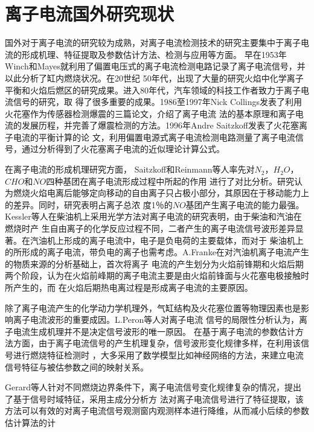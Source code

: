 \section{离子电流国外研究现状}
国外对于离子电流的研究较为成熟，对离子电流检测技术的研究主要集中于离子电流的形成机理、特征提取及参数估计方法、检测与应用等方面。
早在1953年Winch和Mayes\cite{winch1953method}就利用了偏置电压式的离子电流检测电路记录了离子电流信号，并以此分析了缸内燃烧状况。在20世纪
50年代，出现了大量的研究火焰中化学离子平衡和火焰后燃区的研究成果。进入80年代，汽车领域的科技工作者致力于离子电流信号的研究，取
得了很多重要的成果。1986至1997年Nick Collings\cite{collings1986knock,collings1991plug,collings1985knock}发表了利用火花塞作为传感器检测爆震的三篇论文，介绍了离子电流
法的基本原理和离子电流的发展历程，并完善了爆震检测的方法。1996年Andre Saitzkoff\cite{saitzkoff1996ionization}发表了火花塞离子电流的平衡计算的论
文，利用偏置电源式离子电流检测电路测量了离子电流信号，通过分析得到了火花塞离子电流的近似理论计算公式。\par
在离子电流的形成机理研究方面， Saitzkoff和Reinmann等人\cite{saitzkoff1996ionization}率先对$N_{2}$，$H_{2}O$，$CHO$和$NO$四种基团在离子电流形成过程中所起的作用
进行了对比分析。研究认为燃烧火焰电离后能够定向移动的自由离子只占极小部分，其原因在于移动能力上的差异。同时，研究表明占离子总浓
度1％的$NO$基团产生离子电流的能力最强。Kessler等人\cite{kessler}在柴油机上采用光学方法对离子电流的研究表明，由于柴油和汽油在燃烧时产
生自由离子的化学反应过程不同，二者产生的离子电流信号波形差异显著。在汽油机上形成的离子电流中，电子是负电荷的主要载体，而对于
柴油机上的所形成的离子电流，带负电的离子也需考虑。A.Franke\cite{franke2003analysis}在对汽油机离子电流产生的物质来源的分析基础上，首次将离子
电流的产生划分为火焰前锋期和火焰后期两个阶段，认为在火焰前峰期的离子电流主要是由火焰前锋面与火花塞电极接触时所产生的，而
在火焰后期热电离过程是形成离子电流的主要原因。\par
除了离子电流产生的化学动力学机理外，气缸结构及火花塞位置等物理因素也是影响离子电流波形的重要成因。L.Peron等人\cite{peron2000limitations}对离子电流
信号的局限性分析认为，离子电流生成机理并不是决定信号波形的唯一原因。
在基于离子电流的参数估计方法方面，由于离子电流信号的产生机理复杂，信号波形变化规律多样，在利用该信号进行燃烧特征检测时
，大多采用了数学模型比如神经网络的方法，来建立电流信号特征与被估参数之间的映射关系。\par
Gerard等人\cite{malaczynski2003real}针对不同燃烧边界条件下，离子电流信号变化规律复杂的情况，提出了基于信号时域特征，采用主成分分析方
法对离子电流信号进行了特征提取，该方法可以有效的对离子电流信号观测窗内观测样本进行降维，从而减小后续的参数估计算法的计

